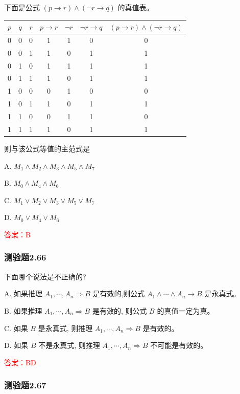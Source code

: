 \documentclass[UTF8, heading=true]{ctexart}
\begin{document}
下面是公式 $(p \rightarrow r) \wedge(\neg r \rightarrow q)$ 的真值表。
\begin{table}[htbp]
  \centering
\begin{tabular}{c|c|c|c|c|c|c}
\hline$p$ & $q$ & $r$ & $p \rightarrow r$ & $\neg r$ & $\neg r \rightarrow q$ & $(p \rightarrow r) \wedge(\neg r \rightarrow q)$ \\
\hline 0 & 0 & 0 & 1 & 1 & 0 & 0 \\
\hline 0 & 0 & 1 & 1 & 0 & 1 & 1 \\
\hline 0 & 1 & 0 & 1 & 1 & 1 & 1 \\
\hline 0 & 1 & 1 & 1 & 0 & 1 & 1 \\
\hline 1 & 0 & 0 & 0 & 1 & 0 & 0 \\
\hline 1 & 0 & 1 & 1 & 0 & 1 & 1 \\
\hline 1 & 1 & 0 & 0 & 1 & 1 & 0 \\
\hline 1 & 1 & 1 & 1 & 0 & 1 & 1 \\
\hline
\end{tabular}
\end{table}

则与该公式等值的主范式是

A. $
M_1 \wedge M_2 \wedge M_3 \wedge M_5 \wedge M_7
$

B. $
M_0 \wedge M_4 \wedge M_6
$

C. $
M_1 \vee M_2 \vee M_3 \vee M_5 \vee M_7
$

D. $
M_0 \vee M_4 \vee M_6
$

\textcolor{red}{答案：B}

\subsubsection{测验题2.66}

下面哪个说法是不正确的?

A. 如果推理 $A_1, \cdots, A_n \Longrightarrow B$ 是有效的,则公式 $A_1 \wedge \cdots \wedge A_n \rightarrow B$ 是永真式。

B.   如果推理 $A_1, \cdots, A_n \Longrightarrow B$ 是有效的, 则公式 $B$ 的真值一定为真。

C.    如果 $B$ 是永真式, 则推理 $A_1, \cdots, A_n \Longrightarrow B$ 是有效的。

D. 如果 $B$ 不是永真式, 则推理 $A_1, \cdots, A_n \Longrightarrow B$ 不可能是有效的。


\textcolor{red}{答案：BD}

\subsubsection{测验题2.67}
\end{document}
